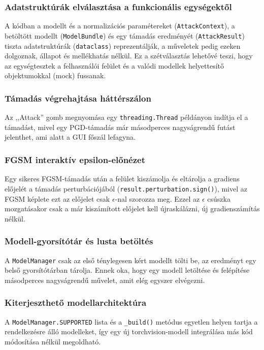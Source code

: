 \subsubsection{Adatstruktúrák elválasztása a funkcionális egységektől}
A kódban a modellt és a normalizációs paramétereket (\texttt{AttackContext}), a betöltött modellt (\texttt{ModelBundle}) és egy 
támadás eredményét (\texttt{AttackResult}) tiszta adatstruktúrák (\texttt{dataclass}) reprezentálják, a műveletek pedig ezeken 
dolgoznak, állapot és mellékhatás nélkül. 
Ez a szétválasztás lehetővé teszi, hogy az egységtesztek a felhasználói felület és a valódi modellek helyettesítő objektumokkal 
(mock) fussanak. 

\subsubsection{Támadás végrehajtása háttérszálon}
Az ,,Attack'' gomb megnyomása egy \texttt{threading.Thread} példányon indítja el a támadást, mivel egy PGD-támadás már 
másodperces nagyságrendű futást jelenthet, ami alatt a GUI főszál lefagyna. 

\subsubsection{FGSM interaktív epsilon-előnézet}
Egy sikeres FGSM-támadás után a felület kiszámolja és eltárolja a gradiens előjelét a támadás perturbációjából (\texttt{result.perturbation.sign()}), mivel az FGSM 
képlete ezt az előjelet csak $\epsilon$-nal szorozza meg. 
Ezzel az $\epsilon$ csúszka mozgatásakor csak a már kiszámított előjelet kell újraskálázni, új gradienszámítás nélkül. 

\subsubsection{Modell-gyorsítótár és lusta betöltés}
A \texttt{ModelManager} csak az első ténylegesen kért modellt tölti be, az eredményt egy belső gyorsítótárban tárolja. 
Ennek oka, hogy egy modell letöltése és felépítése másodperces nagyságrendű művelet, amit elég egyszer elvégezni. 

\subsubsection{Kiterjeszthető modellarchitektúra}
A \texttt{ModelManager.SUPPORTED} lista és a \texttt{\_build()} metódus egyetlen helyen tartja a rendelkezésre álló modelleket, 
így egy új torchvision-modell integrálása más kód módosítása nélkül megoldható. 


